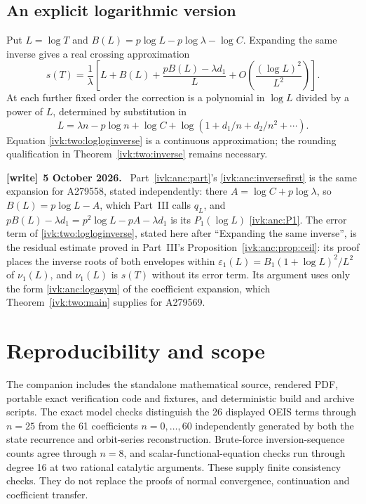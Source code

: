 \documentclass[11pt,letterpaper]{article}
\theoremstyle{remark}\newtheorem{remark}[theorem]{Remark}
\newcommand{\eps}{\varepsilon}
\newenvironment{writenote}[1][]{\par\smallskip\begingroup\small
 \noindent\textbf{[write]}\if\relax\detokenize{#1}\relax\else~\textbf{#1.}\fi\ }%
 {\par\endgroup\smallskip}
\begin{document}
\subsection{An explicit logarithmic version}\label{ivk:two:sec:loglog}
Put $L=\log T$ and
$B(L)=p\log L-p\log\lambda-\log C$. Expanding the same inverse gives
a real crossing approximation
\begin{equation}\label{ivk:two:logloginverse}
 s(T)=\frac1\lambda\left[
 L+B(L)+\frac{pB(L)-\lambda d_1}{L}
       +O\!\left(\frac{(\log L)^2}{L^2}\right)\right].
\end{equation}
At each further fixed order the correction is a polynomial in
$\log L$ divided by a power of $L$, determined by substitution in
\[
 L=\lambda n-p\log n+\log C+
       \log(1+d_1/n+d_2/n^2+\cdots).
\]
Equation \eqref{ivk:two:logloginverse} is a continuous approximation; the
rounding qualification in Theorem~\ref{ivk:two:inverse} remains necessary.
\begin{writenote}[5 October 2026]
Part~\ref{ivk:anc:part}'s \eqref{ivk:anc:inversefirst} is the same expansion for A279558, stated independently: there $A=\log C+p\log\lambda$, so $B(L)=p\log L-A$, which Part~III calls $q_L$, and $pB(L)-\lambda d_1=p^2\log L-pA-\lambda d_1$ is its $P_1(\log L)$ \eqref{ivk:anc:P1}. The error term of \eqref{ivk:two:logloginverse}, stated here after ``Expanding the same inverse'', is the residual estimate proved in Part~III's Proposition~\ref{ivk:anc:prop:ceil}: its proof places the inverse roots of both envelopes within $\eps_1(L)=B_1(1+\log L)^2/L^2$ of $\nu_1(L)$, and $\nu_1(L)$ is $s(T)$ without its error term. Its argument uses only the form \eqref{ivk:anc:logasym} of the coefficient expansion, which Theorem~\ref{ivk:two:main} supplies for A279569.
\end{writenote}


\section{Reproducibility and scope}\label{ivk:two:sec:reproduce}
The companion includes the standalone mathematical source, rendered
PDF, portable exact verification code and fixtures, and deterministic
build and archive scripts. The exact model checks distinguish the
26 displayed OEIS terms through $n=25$ from the 61 coefficients
$n=0,\ldots,60$ independently generated by both the state recurrence
and orbit-series reconstruction. Brute-force inversion-sequence
counts agree through $n=8$, and scalar-functional-equation checks
run through degree 16 at two rational catalytic arguments. These
supply finite consistency checks. They do not replace the proofs of normal convergence,
continuation and coefficient transfer.
\end{document}

